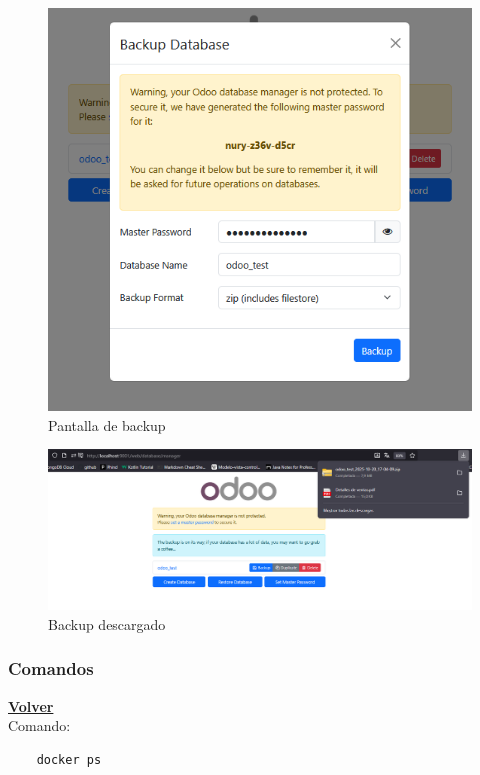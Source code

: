 \documentclass[a4paper,12pt]{article}
\begin{document}
\begin{figure}[h!]
    \centering
    \includegraphics[width=1\textwidth]{pr2odoo77-backupInterfazPantallaCambio.png}
    \caption{Pantalla de backup}
\end{figure}
\FloatBarrier

\begin{figure}[h!]
    \centering
    \includegraphics[width=1\textwidth]{pr2odoo78-backupInterfazDescargado.png}
    \caption{Backup descargado}
\end{figure}
\FloatBarrier

\subsubsection{Comandos}
\hyperlink{anchor-indice}{\textbf{Volver}}\\

Comando: 
\begin{verbatim}
    docker ps
\end{verbatim}
\end{document}
